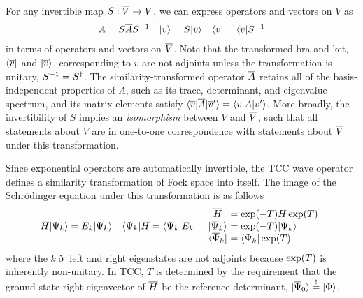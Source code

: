 \documentclass[11pt]{article}
\numberwithin{equation}{section}
\begin{document}
\begin{dfn}
For any invertible map $S:\overline{V}\rightarrow V$, we can express operators and vectors on $V$ as
\begin{align}
  A
=
  S
  \overline{A}
  S^{-1}
&&
  |v\rangle
=
  S
  |\overline{v}\rangle
&&
  \langle v|
=
  \langle\overline{v}|
  S^{-1}
\end{align}
in terms of operators and vectors on $\overline{V}$.
Note that the transformed bra and ket, $\langle\overline{v}|$ and $|\overline{v}\rangle$, corresponding to $v$ are not adjoints unless the transformation is unitary, $S^{-1}=S^\dagger$.
The similarity-transformed operator $\overline{A}$ retains all of the basis-independent properties of $A$, such as its trace, determinant, and eigenvalue spectrum, and its matrix elements satisfy $\langle\overline{v}|\overline{A}|\overline{v}'\rangle=\langle v|A|v'\rangle$.
More broadly, the invertibility of $S$ implies an \textit{isomorphism} between $V$ and $\overline{V}$, such that all statements about $V$ are in one-to-one correspondence with statements about $\overline{V}$ under this transformation.
\end{dfn}


\begin{rmk}
Since exponential operators are automatically invertible, the TCC wave operator defines a similarity transformation of Fock space into itself.
The image of the Schr\"odinger equation under this transformation is as follows
\begin{align}
\label{eq:similarity-transformed-schrodinger-equation}
  \ol{H}
  \kt{\ol{\Y}_k}
=
  E_k
  \kt{\ol{\Y}_k}
&&
  \br{\ol{\Y}_k}
  \ol{H}
=
  \br{\ol{\Y}_k}
  E_k
&&
\begin{array}{c@{\ }l}
  \ol{H}
&=
  \mr{exp}(-T)
  H\,
  \mr{exp}(T)
\\
  \kt{\ol{\Y}_k}
&=
  \mr{exp}(-T)
  \kt{\Y_k}
\\
  \br{\ol{\Y}_k}
&=
  \br{\Y_k}\,
  \mr{exp}(T)
\end{array}
\end{align}
where the $k\eth$ left and right eigenstates are not adjoints because $\mathrm{exp}(T)$ is inherently non-unitary.
In TCC, $T$ is determined by the requirement that the ground-state right eigenvector of $\overline{H}$ be the reference determinant,
$
  |\overline{\Psi }_0\rangle
\overset{!}{=}
  |\Phi \rangle
$.
\end{rmk}
\end{document}
